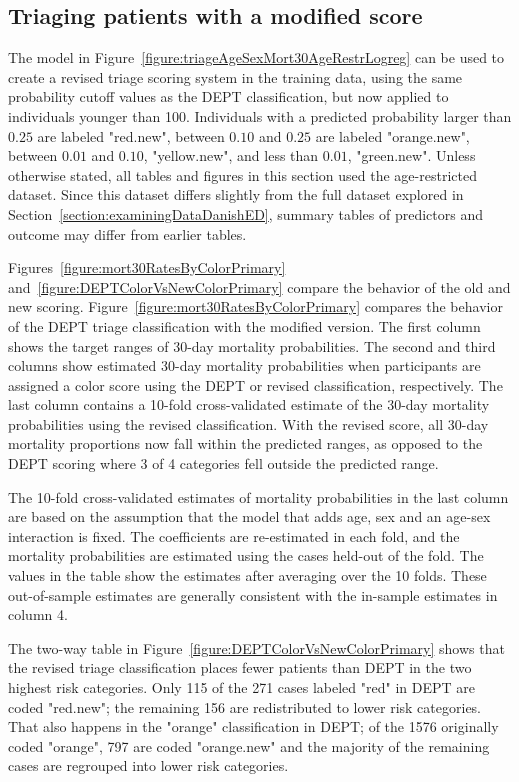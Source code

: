 
\subsection{Triaging patients with a modified score}
\label{section:triageWithModifiedScore}

The model in Figure~\ref{figure:triageAgeSexMort30AgeRestrLogreg} can be used to create a revised triage scoring system in the training data, using the same probability cutoff values as the DEPT classification, but now applied to individuals younger than 100.  Individuals with a predicted probability larger than $0.25$ are labeled "red.new", between $0.10$ and $0.25$ are labeled "orange.new", between $0.01$ and $0.10$, "yellow.new", and less than $0.01$, "green.new".  Unless otherwise stated, all tables and figures in this section used the age-restricted dataset. Since this dataset differs slightly from the full dataset explored in Section~\ref{section:examiningDataDanishED}, summary tables of predictors and outcome may differ from earlier tables. 

Figures~\ref{figure:mort30RatesByColorPrimary} and~\ref{figure:DEPTColorVsNewColorPrimary} compare the behavior of the old and new scoring.   Figure~\ref{figure:mort30RatesByColorPrimary} compares the behavior of the DEPT triage classification with the modified version.  The first column shows the target ranges of 30-day mortality probabilities.  The second and third columns show estimated 30-day mortality probabilities when participants are assigned a color score using the DEPT or revised classification, respectively.  The last column contains a 10-fold cross-validated estimate of the 30-day mortality probabilities using the revised classification. With the revised score, all 30-day mortality proportions now fall within the predicted ranges, as opposed to the DEPT scoring where 3 of 4 categories fell outside the predicted range.

 The 10-fold cross-validated estimates of mortality probabilities in the last column are based on the assumption that the model that adds age, sex and an age-sex interaction is fixed.  The coefficients are re-estimated in each fold, and the mortality probabilities are estimated using the cases held-out of the fold.  The values in the table show the estimates after averaging over the 10 folds.  These out-of-sample estimates are generally consistent with the in-sample estimates in column 4.

The two-way table in Figure~\ref{figure:DEPTColorVsNewColorPrimary} shows that the revised triage classification places fewer patients than DEPT in the two highest risk categories.  Only 115 of the 271 cases labeled "red" in DEPT are coded "red.new"; the remaining 156 are redistributed to lower risk categories.  That also happens in the "orange" classification in DEPT; of the 1576 originally coded "orange", 797 are coded "orange.new" and the majority of the remaining cases are regrouped into lower risk categories.

